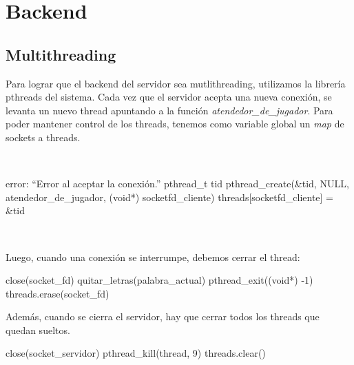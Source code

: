 \section{Backend}

\subsection{Multithreading}

Para lograr que el backend del servidor sea mutlithreading, utilizamos la librería pthreads del sistema. Cada vez que el servidor acepta una nueva conexión, se levanta un nuevo thread apuntando a la función \textit{atendedor\_de\_jugador}. Para poder mantener control de los threads, tenemos como variable global un \textit{map} de sockets a threads.

\ 
\begin{algorithmic}
  \STATE error: ``Error al aceptar la conexión.''
\ELSE
  \STATE pthread\_t tid
  \STATE pthread\_create(\&tid, NULL, atendedor\_de\_jugador, (void*) socketfd\_cliente)
  \STATE threads[socketfd\_cliente] = \&tid
\ENDIF
\end{algorithmic}
\

Luego, cuando una conexión se interrumpe, debemos cerrar el thread:
\
\begin{algorithm}[H]
\caption{$terminar\_servidor\_de\_jugador(socket\_fd, palabra\_actual)$}
\begin{algorithmic}[1]
\STATE close(socket\_fd)
\STATE quitar\_letras(palabra\_actual)
\STATE pthread\_exit((void*) -1)
\STATE threads.erase(socket\_fd)
\end{algorithmic}
\end{algorithm}

Además, cuando se cierra el servidor, hay que cerrar todos los threads que quedan sueltos.
\
\begin{algorithm}[H]
\caption{$cerrar\_servidor(signal)$}
\begin{algorithmic}
\STATE close(socket\_servidor)
\FOR{thread \textbf{en} threads}
  \STATE pthread\_kill(thread, 9)
\ENDFOR
\STATE threads.clear()
\end{algorithmic}
\end{algorithm}
